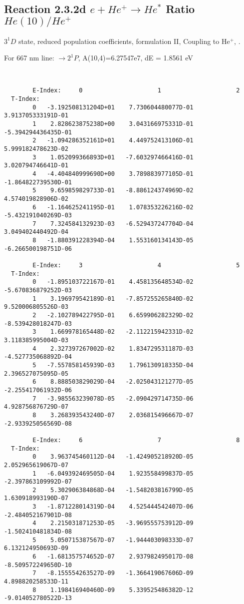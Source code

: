 \documentclass[12pt,dvipdfmx]{article}
\begin{document}
{\subsection{
  Reaction 2.3.2d $e + He^+ \rightarrow He^*  $ Ratio $He(10)/He^+$
}

  $3^1D$ state,
  reduced population coefficients, formulation II,
  Coupling to He$^+$, \cite{kn:Fujimoto}.

  For 667 nm line: $\rightarrow 2^1P$, A(10,4)=6.27547e7, dE = 1.8561 eV

\begin{small}\begin{verbatim}


        E-Index:     0                     1                     2
  T-Index:
        0   -3.192508131204D+01    7.730604480077D-01    3.913705333191D-01
        1    2.828623875238D+00    3.043166975331D-01   -5.394294436435D-01
        2   -1.094286352161D+01    4.449752413106D-01    5.999182478623D-02
        3    1.052099366893D+01   -7.603297466416D-01    3.020794746641D-01
        4   -4.404840999690D+00    3.789883977105D-01   -1.864822739530D-01
        5    9.659859829733D-01   -8.886124374969D-02    4.574019828906D-02
        6   -1.164625241195D-01    1.078353226216D-02   -5.432191040269D-03
        7    7.324584132923D-03   -6.529437247704D-04    3.049402440492D-04
        8   -1.880391228394D-04    1.553160134143D-05   -6.266500198751D-06

        E-Index:     3                     4                     5
  T-Index:
        0   -1.895103722167D-01    4.458135648534D-02   -5.670836879252D-03
        1    3.196979542189D-01   -7.857255265840D-02    9.520006805526D-03
        2   -2.102789422795D-01    6.659906282329D-02   -8.539428018247D-03
        3    1.669978165448D-02   -2.112215942331D-02    3.118385995004D-03
        4    2.327397267002D-02    1.834729531187D-03   -4.527735068892D-04
        5   -7.557858145939D-03    1.796130918335D-04    2.396527075095D-05
        6    8.888503829029D-04   -2.025043121277D-05   -2.255417061932D-06
        7   -3.985563239078D-05   -2.090429714735D-06    4.928756876729D-07
        8    3.268393543240D-07    2.036815496667D-07   -2.933925056569D-08

        E-Index:     6                     7                     8
  T-Index:
        0    3.963745460112D-04   -1.424905218920D-05    2.052965619067D-07
        1   -6.049392469505D-04    1.923558499837D-05   -2.397863109992D-07
        2    5.302906384868D-04   -1.548203816799D-05    1.630918993190D-07
        3   -1.871228014319D-04    4.525444542407D-06   -2.484052167901D-08
        4    2.215031871253D-05   -3.969555753912D-09   -1.502410481834D-08
        5    5.050715387567D-07   -1.944403098333D-07    6.132124950693D-09
        6   -1.681357574652D-07    2.937982495017D-08   -8.509572249650D-10
        7   -8.155554263527D-09   -1.366419067606D-09    4.898820258533D-11
        8    1.198416940460D-09    5.339525486382D-12   -9.014052780522D-13


\end{verbatim}
\end{small}}
\end{document}
